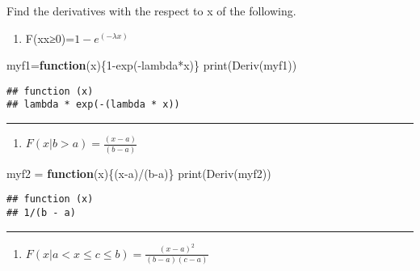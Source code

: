 \documentclass[
]{article}
\newenvironment{Shaded}{\begin{snugshade}}{\end{snugshade}}
\newcommand{\ControlFlowTok}[1]{\textcolor[rgb]{0.13,0.29,0.53}{\textbf{#1}}}
\newcommand{\DecValTok}[1]{\textcolor[rgb]{0.00,0.00,0.81}{#1}}
\newcommand{\FunctionTok}[1]{\textcolor[rgb]{0.00,0.00,0.00}{#1}}
\newcommand{\NormalTok}[1]{#1}
\newcommand{\OtherTok}[1]{\textcolor[rgb]{0.56,0.35,0.01}{#1}}
\newcommand{\SpecialCharTok}[1]{\textcolor[rgb]{0.00,0.00,0.00}{#1}}
\providecommand{\tightlist}{%
  \setlength{\itemsep}{0pt}\setlength{\parskip}{0pt}}
\begin{document}
Find the derivatives with the respect to x of the following.

\begin{enumerate}
\def\labelenumi{\arabic{enumi}.}
\tightlist
\item
  F(x\textbar x≥0)=\(1−e^{(−\lambda x)}\)
\end{enumerate}

\begin{Shaded}
\begin{Highlighting}[]
\NormalTok{myf1}\OtherTok{=}\ControlFlowTok{function}\NormalTok{(x)\{}\DecValTok{1}\SpecialCharTok{{-}}\FunctionTok{exp}\NormalTok{(}\SpecialCharTok{{-}}\NormalTok{lambda}\SpecialCharTok{*}\NormalTok{x)\}}
\FunctionTok{print}\NormalTok{(}\FunctionTok{Deriv}\NormalTok{(myf1))}
\end{Highlighting}
\end{Shaded}

\begin{verbatim}
## function (x) 
## lambda * exp(-(lambda * x))
\end{verbatim}

\begin{center}\rule{0.5\linewidth}{0.5pt}\end{center}

\begin{enumerate}
\def\labelenumi{\arabic{enumi}.}
\setcounter{enumi}{1}
\tightlist
\item
  \(F(x|b>a)=\frac{(x−a)}{(b−a)}\)
\end{enumerate}

\begin{Shaded}
\begin{Highlighting}[]
\NormalTok{myf2 }\OtherTok{=} \ControlFlowTok{function}\NormalTok{(x)\{(x}\SpecialCharTok{{-}}\NormalTok{a)}\SpecialCharTok{/}\NormalTok{(b}\SpecialCharTok{{-}}\NormalTok{a)\}}
\FunctionTok{print}\NormalTok{(}\FunctionTok{Deriv}\NormalTok{(myf2))}
\end{Highlighting}
\end{Shaded}

\begin{verbatim}
## function (x) 
## 1/(b - a)
\end{verbatim}

\begin{center}\rule{0.5\linewidth}{0.5pt}\end{center}

\begin{enumerate}
\def\labelenumi{\arabic{enumi}.}
\setcounter{enumi}{2}
\tightlist
\item
  \(F(x|a<x≤c≤b)=\frac{(x−a)^2}{(b−a)(c−a)}\)
\end{enumerate}
\end{document}
